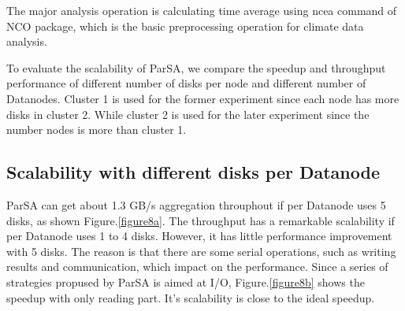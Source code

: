 \documentclass[preprint,12pt]{elsarticle}
\begin{document}
The major analysis operation is calculating time average using ncea command of NCO package, which is the basic preprocessing operation
for climate data analysis. \par

To evaluate the scalability of ParSA, we compare the speedup and throughput performance of different
number of disks per node and different number of Datanodes. Cluster 1 is used for the former experiment since each node has more disks in 
cluster 2. While cluster 2 is used for the later experiment since the number nodes is more than cluster 1. \par 

\subsection{Scalability with different disks per Datanode}
ParSA can get about 1.3 GB/s aggregation throuphout if per Datanode uses 5 disks, as shown Figure.\ref{figure8a}. The throughput has a 
remarkable scalability if per Datanode uses 1 to 4 disks. However, it has little performance improvement with 5 disks. The reason is 
that there are some serial operations, such as writing results and communication, which impact on the performance. Since a series of 
strategies propused by ParSA is aimed at I/O, Figure.\ref{figure8b} shows the speedup with only reading part. It's scalability is close
to the ideal speedup. 
\end{document}
